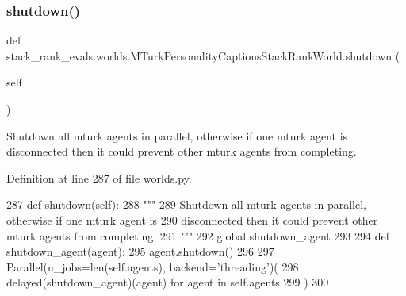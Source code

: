 \mbox{\label{classstack__rank__evals_1_1worlds_1_1MTurkPersonalityCaptionsStackRankWorld_a17e8b57fa31006dcb12852a791a676f9}} 
\subsubsection{\texorpdfstring{shutdown()}{shutdown()}}
{\footnotesize\ttfamily def stack\+\_\+rank\+\_\+evals.\+worlds.\+M\+Turk\+Personality\+Captions\+Stack\+Rank\+World.\+shutdown (\begin{DoxyParamCaption}\item[{}]{self }\end{DoxyParamCaption})}

\begin{DoxyVerb}Shutdown all mturk agents in parallel, otherwise if one mturk agent is
disconnected then it could prevent other mturk agents from completing.
\end{DoxyVerb}
 

Definition at line 287 of file worlds.\+py.


\begin{DoxyCode}
287     \textcolor{keyword}{def }shutdown(self):
288         \textcolor{stringliteral}{"""}
289 \textcolor{stringliteral}{        Shutdown all mturk agents in parallel, otherwise if one mturk agent is}
290 \textcolor{stringliteral}{        disconnected then it could prevent other mturk agents from completing.}
291 \textcolor{stringliteral}{        """}
292         \textcolor{keyword}{global} shutdown\_agent
293 
294         \textcolor{keyword}{def }shutdown\_agent(agent):
295             agent.shutdown()
296 
297         Parallel(n\_jobs=len(self.agents), backend=\textcolor{stringliteral}{'threading'})(
298             delayed(shutdown\_agent)(agent) \textcolor{keywordflow}{for} agent \textcolor{keywordflow}{in} self.agents
299         )
300 \end{DoxyCode}


